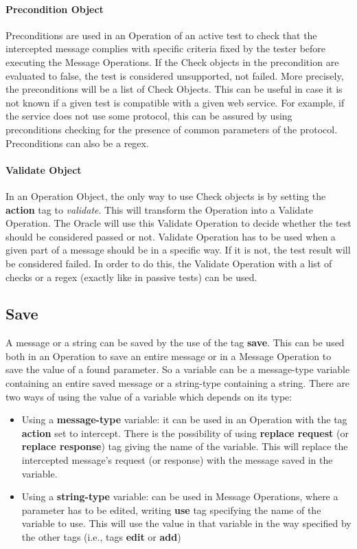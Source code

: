 \paragraph{Precondition Object}
Preconditions are used in an Operation of an active test to check that the intercepted message complies with specific criteria fixed by the tester before executing the Message Operations. If the Check objects in the precondition are evaluated to false, the test is considered unsupported, not failed. More precisely, the preconditions will be a list of Check Objects. This can be useful in case it is not known if a given test is compatible with a given web service. For example, if the service does not use some protocol, this can be assured by using preconditions checking for the presence of common parameters of the protocol. Preconditions can also be a regex.
\paragraph{Validate Object}
In an Operation Object, the only way to use Check objects is by setting the \textbf{action} tag to \textit{validate}. This will transform the Operation into a Validate Operation. The Oracle will use this Validate Operation to decide whether the test should be considered passed or not. Validate Operation has to be used when a given part of a message should be in a specific way. If it is not, the test result will be considered failed.
In order to do this, the Validate Operation with a list of checks or a regex (exactly like in passive tests) can be used.

\subsection{Save}
A message or a string can be saved by the use of the tag \textbf{save}. This can be used both in an Operation to save an entire message or in a Message Operation to save the value of a found parameter. So a variable can be a message-type variable containing an entire saved message or a string-type containing a string.
There are two ways of using the value of a variable which depends on its type:
\begin{itemize}
    \item Using a \textbf{message-type} variable: it can be used in an Operation with the tag \textbf{action} set to intercept. There is the possibility of using \textbf{replace request} (or \textbf{replace response}) tag giving the name of the variable. This will replace the intercepted message's request (or response) with the message saved in the variable.
    \item Using a \textbf{string-type} variable: can be used in Message Operations, where a parameter has to be edited, writing \textbf{use} tag specifying the name of the variable to use. This will use the value in that variable in the way specified by the other tags (i.e., tags \textbf{edit} or \textbf{add})
\end{itemize}

